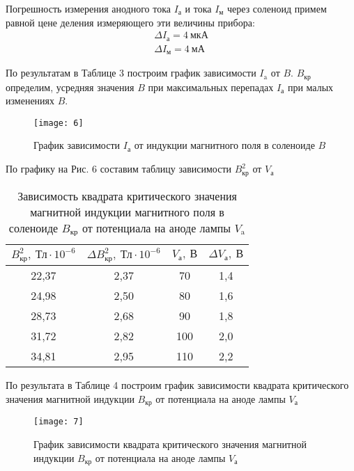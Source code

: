 Погрешность измерения анодного тока $I_\text{а}$ и тока $I_\text{м}$ через соленоид примем равной
цене деления измеряющего эти величины прибора:
\begin{equation*}
    \begin{aligned}
        \Delta I_\text{а} = 4 \ \text{мкА}\\
        \Delta I_\text{м} = 4 \ \text{мА}
    \end{aligned}
\end{equation*}

По результатам в Таблице 3 построим график зависимости  $I_\text{a}$ от $B$. $B_\text{кр}$
определим, усредняя значения $B$ при максимальных перепадах $I_\text{а}$ при малых изменениях $B$.
\begin{figure}[H]
    \texttt{[image: 6]}
    \captionsetup{justification=centering}
    \caption{График зависимости $I_\text{а}$ от индукции магнитного поля в соленоиде $B$}
\end{figure}

По графику на Рис. 6 составим таблицу зависимости $B_\text{кр}^2$ от $V_\text{а}$
\begin{table}[H]
\centering
\begin{tabular}{|c|c|c|c|}
\hline
$B_\text{кр}^2,\ \text{Тл} \cdot 10^{-6}$        & $\Delta B_\text{кр}^2,\ \text{Тл} \cdot 10^{-6}$
& $V_\text{а}, \ \text{В}$   & $\Delta V_\text{а}, \ \text{В}$  \\ \hline
22,37   & 2,37 & 70  & 1,4 \\ \hline
24,98 & 2,50 & 80  & 1,6 \\ \hline
28,73   & 2,68  & 90  & 1,8 \\ \hline
31,72 & 2,82 & 100 & 2,0   \\ \hline
34,81     & 2,95  & 110 & 2,2 \\ \hline
\end{tabular}
\captionsetup{justification=centering}
\caption{Зависимость квадрата критического значения магнитной индукции магнитного поля в соленоиде  $B_\text{кр}$ от
потенциала на аноде лампы $V_\text{a}$}
\end{table}

По результата в Таблице 4 построим график зависимости квадрата критического значения магнитной
индукции $B_\text{кр}$ от потенциала на аноде лампы $V_\text{а}$

\begin{figure}[H]
    \texttt{[image: 7]}
    \captionsetup{justification=centering}
    \caption{График зависимости квадрата критического значения магнитной
индукции $B_\text{кр}$ от потенциала на аноде лампы $V_\text{а}$
}
\end{figure}
 
